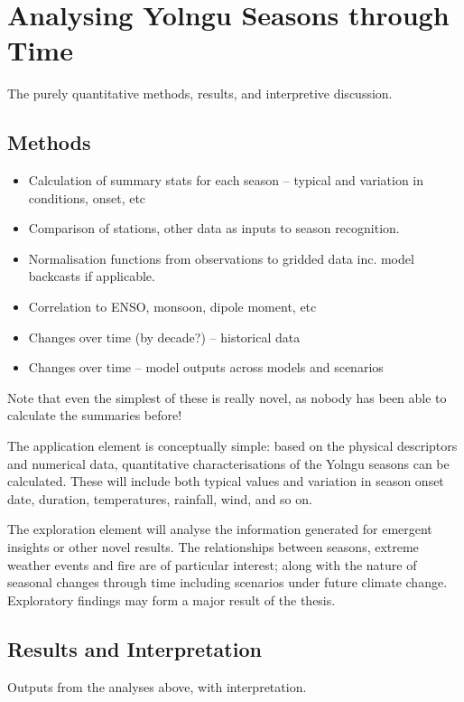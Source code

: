 \chapter{Analysing Yolngu Seasons through Time}
\label{ch:analysis}

The purely quantitative methods, results, and interpretive discussion.

\section{Methods}

\begin{itemize}
\item Calculation of summary stats for each season – typical and variation in conditions, onset, etc
\item Comparison of stations, other data as inputs to season recognition.
\item Normalisation functions from observations to gridded data inc. model backcasts if applicable.
\item Correlation to ENSO, monsoon, dipole moment, etc
\item Changes over time (by decade?) – historical data
\item Changes over time – model outputs across models and scenarios
\end{itemize}

Note that even the simplest of these is really novel, as nobody has been able to calculate the summaries before!

The application element is conceptually simple:  based on the physical
descriptors and numerical data, quantitative characterisations of the
Yolngu seasons can be calculated.  These will include both typical values
and variation in season onset date, duration, temperatures, rainfall,
wind, and so on.

The exploration element will analyse the information generated for emergent
insights or other novel results.  The relationships between seasons, extreme
weather events and fire are of particular interest; along with the nature of
seasonal changes through time including scenarios under future climate change.
Exploratory findings may form a major result of the thesis.


\section{Results and Interpretation}
Outputs from the analyses above, with interpretation.

